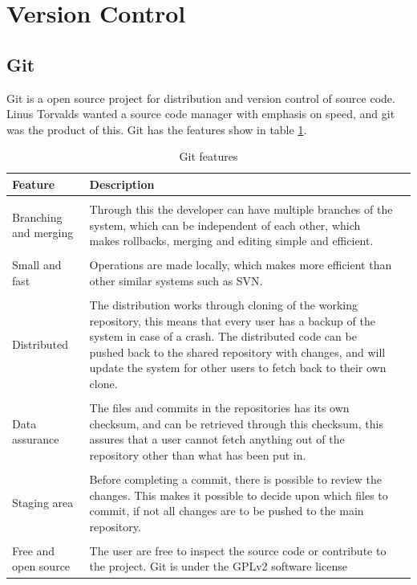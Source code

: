 \section{Version Control}
\subsection{Git}
Git is a open source project for distribution and version control of source code. Linus Torvalds wanted a source code manager with emphasis on speed, and git was the product of this. Git has the features show in table \ref{table-gitfeatures}.

\begin{table}
\centering
\begin{tabularx}{\textwidth}{ l X l }
  \textbf{Feature}      & \textbf{Description} \\
  \hline \\ [-1.5ex]
  Branching and merging & Through this the developer can have multiple branches of the system, which can be independent of each other, which makes rollbacks, merging and editing simple and efficient. \vspace*{0.7ex} \\
  \hline \\ [-1.5ex]
  Small and fast        & Operations are made locally, which makes more efficient than other similar systems such as SVN. \\
  \hline \\ [-1.5ex]
  Distributed           & The distribution works through cloning of the working repository, this means that every user has a backup of the system in case of a crash. The distributed code can be pushed back to the shared repository with changes, and will update the system for other users to fetch back to their own clone. \\
  \hline \\ [-1.5ex]
  Data assurance        & The files and commits in the repositories has its own checksum, and can be retrieved through this checksum, this assures that a user cannot fetch anything out of the repository other than what has been put in. \\
  \hline \\ [-1.5ex]
  Staging area          & Before completing a commit, there is possible to review the changes. This makes it possible to decide upon which files to commit, if not all changes are to be pushed to the main repository. \\
  \hline \\ [-1.5ex]
  Free and open source  & The user are free to inspect the source code or contribute to the project. Git is under the GPLv2 software license\\
\end{tabularx}
\caption{Git features}
\label{table-gitfeatures}
\end{table}


